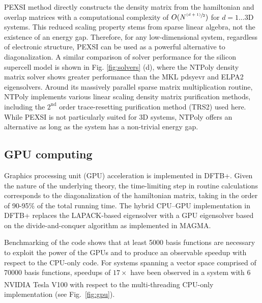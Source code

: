 \documentclass[reprint,onecolumn,superscriptaddress]{revtex4-1}
\newcommand{\dftbp}{DFTB+}
\begin{document}
PEXSI\cite{pexsi_lin_2013} method directly constructs the density matrix from
the hamiltonian and overlap matrices with a computational complexity of
$O(N^{\sfrac{(d+1)}{2}})$ for $d=1\ldots3$D systems. This reduced scaling
property stems from sparse linear algebra, not the existence of an energy
gap. Therefore, for any low-dimensional system, regardless of electronic
structure, PEXSI can be used as a powerful alternative to diagonalization. A
similar comparison of solver performance for the silicon supercell model is
shown in Fig. \ref{fig:solvers} (d), where the NTPoly density matrix solver
shows greater performance than the MKL pdsyevr and ELPA2 eigensolvers. Around
its massively parallel sparse matrix multiplication routine, NTPoly implements
various linear scaling density matrix purification methods, including the
$2^\text{nd}$ order trace-resetting purification method
(TRS2)\cite{ANiklasson02} used here. While PEXSI is not
particularly suited for 3D systems, NTPoly offers an alternative as long as the
system has a non-trivial energy gap.

\subsection{GPU computing}

Graphics processing unit (GPU) acceleration is implemented in \dftbp{}. Given
the nature of the underlying theory, the time-limiting step in routine
calculations corresponds to the diagonalization of the hamiltonian matrix,
taking in the order of 90-95\% of the total running time. The hybrid CPU--GPU
implementation in \dftbp{} replaces the LAPACK-based eigensolver with a GPU
eigensolver based on the divide-and-conquer algorithm as implemented in
MAGMA.\cite{TOMOV2010232}

Benchmarking of the code shows that at least 5000 basis functions are necessary
to exploit the power of the GPUs and to produce an observable speedup with
respect to the CPU-only code. For systems spanning a vector space comprised of
70000 basis functions, speedups of $17\times$ have been observed in a system
with 6 NVIDIA\textsuperscript{\textregistered}
Tesla\textsuperscript{\textregistered} V100 with respect to the multi-threading
CPU-only implementation (see Fig.~\ref{fig:gpu}).
\end{document}
